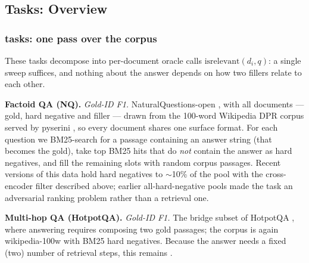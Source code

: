 \subsection{Tasks: Overview}

\subsubsection{\texorpdfstring{}{OT(N)} tasks: one pass over the corpus}

These tasks decompose into per-document oracle calls $\mathrm{isrelevant}(d_i, q)$: a single sweep suffices, and nothing about the answer depends on how two fillers relate to each other.

\textbf{Factoid QA (NQ).} \emph{Gold-ID F1.} NaturalQuestions-open \citep{izacardNQ}, with all documents --- gold, hard negative and filler --- drawn from the 100-word Wikipedia DPR corpus \citep{Karpukhin2020DensePR} served by pyserini \citep{Lin2021PyseriniAP}, so every document shares one surface format. For each question we BM25-search \citep{Robertson1976RelevanceWOBM25} for a passage containing an answer string (that becomes the gold), take top BM25 hits that do \emph{not} contain the answer as hard negatives, and fill the remaining slots with random corpus passages. Recent versions of this data hold hard negatives to $\sim$10\% of the pool with the cross-encoder filter described above; earlier all-hard-negative pools made the task an adversarial ranking problem rather than a retrieval one.

\textbf{Multi-hop QA (HotpotQA).} \emph{Gold-ID F1.} The bridge subset of HotpotQA \citep{Yang2018HotpotQAAD}, where answering requires composing two gold passages; the corpus is again wikipedia-100w with BM25 hard negatives. Because the answer needs a fixed (two) number of retrieval steps, this remains .

